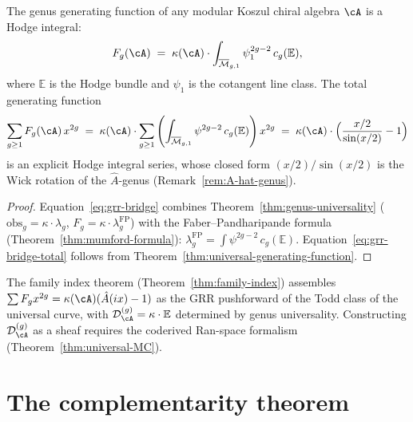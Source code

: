 \begin{proposition}
\label{prop:grr-bridge}
The genus generating function of any modular Koszul chiral algebra
$\cA$ is a Hodge integral:
\begin{equation}\label{eq:grr-bridge}
F_g(\cA) \;=\; \kappa(\cA) \cdot
\int_{\overline{\mathcal{M}}_{g,1}} \psi_1^{2g-2}\, c_g(\mathbb{E}),
\end{equation}
where $\mathbb{E}$ is the Hodge bundle and $\psi_1$ is the
cotangent line class.  The total generating function
\begin{equation}\label{eq:grr-bridge-total}
\sum_{g \geq 1} F_g(\cA)\, x^{2g}
\;=\; \kappa(\cA) \cdot
\sum_{g \geq 1}
\left(\int_{\overline{\mathcal{M}}_{g,1}}
\psi^{2g-2}\, c_g(\mathbb{E})\right) x^{2g}
\;=\;
\kappa(\cA) \cdot \Bigl(\frac{x/2}{\sin(x/2)} - 1\Bigr)
\end{equation}
is an explicit Hodge integral series, whose closed form
$(x/2)/\sin(x/2)$ is the Wick rotation of the $\hat{A}$-genus
\textup{(}Remark~\textup{\ref{rem:A-hat-genus})}.
\end{proposition}

\begin{proof}
Equation~\eqref{eq:grr-bridge} combines
Theorem~\ref{thm:genus-universality} ($\mathrm{obs}_g = \kappa \cdot
\lambda_g$, $F_g = \kappa \cdot \lambda_g^{\mathrm{FP}}$) with
the Faber--Pandharipande formula
(Theorem~\ref{thm:mumford-formula}):
$\lambda_g^{\mathrm{FP}} = \int \psi^{2g-2}\, c_g(\mathbb{E})$.
Equation~\eqref{eq:grr-bridge-total} follows from
Theorem~\ref{thm:universal-generating-function}.
\end{proof}

\begin{remark}\label{rem:towards-family-index}
The family index theorem (Theorem~\ref{thm:family-index}) assembles
$\sum F_g x^{2g}=\kappa(\cA)(\hat{A}(ix)-1)$ as the GRR
pushforward of the Todd class of the universal curve, with
$\mathcal{D}_{\cA}^{(g)}=\kappa\cdot\mathbb{E}$ determined by
genus universality.  Constructing $\mathcal{D}_{\cA}^{(g)}$ as a
sheaf requires the coderived Ran-space formalism
(Theorem~\ref{thm:universal-MC}).
\end{remark}


\section{The complementarity theorem}
\label{sec:complementarity-theorem}


